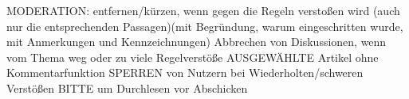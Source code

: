 MODERATION:
entfernen/kürzen, wenn gegen die Regeln verstoßen wird (auch nur die entsprechenden Passagen)(mit Begründung, warum eingeschritten wurde, mit Anmerkungen und Kennzeichnungen)
Abbrechen von Diskussionen, wenn vom Thema weg oder zu viele Regelverstöße
AUSGEWÄHLTE Artikel ohne Kommentarfunktion
SPERREN von Nutzern bei Wiederholten/schweren Verstößen
BITTE um Durchlesen vor Abschicken






















